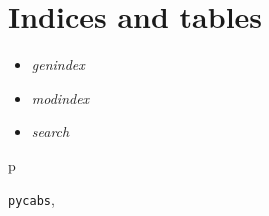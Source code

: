 \documentclass[letterpaper,10pt,english]{sphinxmanual}
\begin{document}
\chapter{Indices and tables}
\label{index:welcome-to-cabs-s-documentation}\label{index::doc}\label{index:module-pycabs}\label{index:indices-and-tables}\begin{itemize}
\item {} 
\emph{genindex}

\item {} 
\emph{modindex}

\item {} 
\emph{search}

\end{itemize}


\renewcommand{\indexname}{Python Module Index}
\begin{theindex}
\def\bigletter#1{{\Large\sffamily#1}\nopagebreak\vspace{1mm}}
\bigletter{p}
\item {\texttt{pycabs}}, \pageref{index:module-pycabs}
\end{theindex}

\renewcommand{\indexname}{Index}
\printindex
\end{document}
